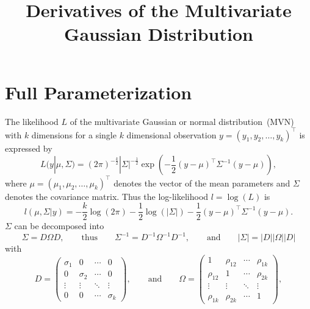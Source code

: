 \documentclass{article}
\begin{document}
\title{Derivatives of the Multivariate Gaussian Distribution}
\author{}
\maketitle

\section{Full Parameterization}

The likelihood $L$ of the multivariate Gaussian or normal distribution~(MVN) with $k$ dimensions for a single $k$ dimensional observation $y = (y_1, y_2, \dots, y_k)^\top$ is expressed by
%
\begin{equation}
 L(y|\mu, \Sigma) = (2\pi)^{-\frac{k}{2}} |\Sigma|^{-\frac{1}{2}} \exp \left(-\frac{1}{2} (y-\mu)^\top \Sigma^{-1} (y-\mu) \right),
\end{equation}
%
where $\mu = (\mu_1, \mu_2, \dots, \mu_k)^\top$ denotes the vector of the mean parameters and $\Sigma$ denotes the covariance matrix. Thus the log-likelihood $l=\log(L)$ is
%
\begin{equation}
 l(\mu, \Sigma|y) = -\frac{k}{2}\log(2\pi) - \frac{1}{2}\log(|\Sigma|) - \frac{1}{2} (y-\mu)^\top \Sigma^{-1} (y-\mu).
 \label{eq:ll1}
\end{equation}
%
$\Sigma$ can be decomposed into
%
\begin{equation}
 \Sigma = D \Omega D, \qquad \text{thus} \qquad \Sigma^{-1} = D^{-1} \Omega^{-1} D^{-1}, \qquad \text{and} \qquad |\Sigma|=|D| |\Omega| |D|
\end{equation}
%
with
%
\begin{equation}
 D=
  \begin{pmatrix}
   \sigma_1 & 0 & \cdots & 0 \\
   0 & \sigma_2 & \cdots & 0 \\
   \vdots  & \vdots  & \ddots & \vdots  \\
   0 & 0 & \cdots & \sigma_k
  \end{pmatrix},
  \qquad \text{and} \qquad
 \Omega=
  \begin{pmatrix}
   1 & \rho_{12} & \cdots & \rho_{1k} \\
   \rho_{12} & 1 & \cdots & \rho_{2k} \\
   \vdots & \vdots & \ddots & \vdots \\
   \rho_{1k} & \rho_{2k} & \cdots & 1
  \end{pmatrix},
  \label{eq:mat}
\end{equation}
\end{document}
